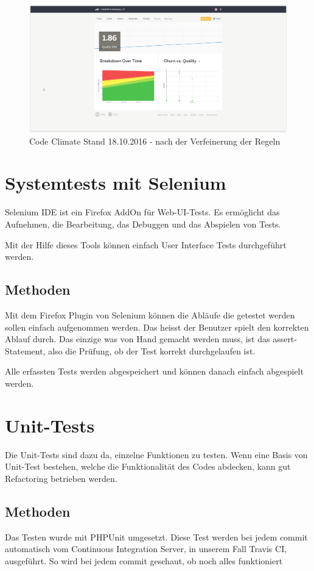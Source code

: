 \begin{figure}[H]
	\centering
	\includegraphics[width=1\textwidth
	]{Images/Stand_Beginn_181016.PNG}
	\caption{Code Climate Stand 18.10.2016 - nach der Verfeinerung der Regeln}
\end{figure}


\section{Systemtests mit Selenium}
Selenium IDE ist ein Firefox AddOn für Web-\acrfull{UI}-Tests. Es ermöglicht das Aufnehmen, die Bearbeitung, das Debuggen und das Abspielen von Tests. 

Mit der Hilfe dieses Tools können einfach \gls{User Interface} Tests durchgeführt werden.

\subsection{Methoden}
Mit dem Firefox Plugin von Selenium können die Abläufe die getestet werden sollen einfach aufgenommen werden. Das heisst der Benutzer spielt den korrekten Ablauf durch. Das einzige was von Hand gemacht werden muss, ist das assert-Statement, also die Prüfung, ob der Test korrekt durchgelaufen ist.

Alle erfassten Tests werden abgespeichert und können danach einfach abgespielt werden.


\section{Unit-Tests}
Die Unit-Tests sind dazu da, einzelne Funktionen zu testen. Wenn eine Basis von Unit-Test bestehen, welche die Funktionalität des Codes abdecken, kann gut Refactoring betrieben werden. 

\subsection{Methoden}
Das Testen wurde mit PHPUnit umgesetzt. Diese Test werden bei jedem commit automatisch vom Continuous Integration Server, in unserem Fall Travis CI, ausgeführt. So wird bei jedem commit geschaut, ob noch alles funktioniert


